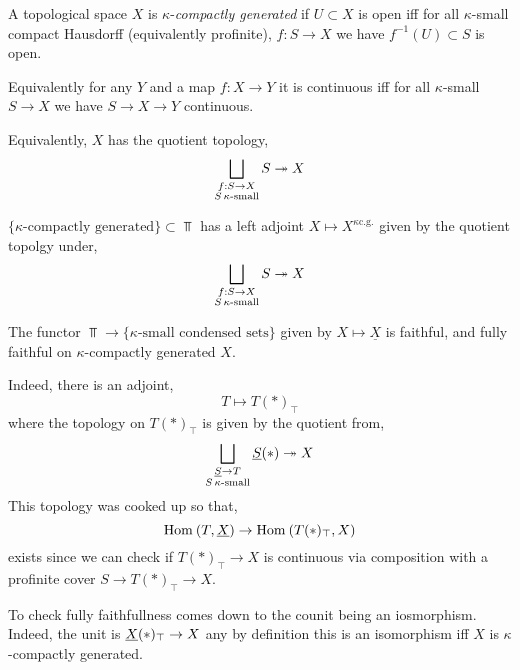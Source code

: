 \documentclass[12pt]{article}
\begin{document}
\begin{defn}
A topological space $X$ is $\kappa$-\textit{compactly generated} if $U \subset X$ is open iff for all $\kappa$-small compact Hausdorff (equivalently profinite), $f : S \to X$ we have $f^{-1}(U) \subset S$ is open. 
\end{defn}

\begin{rmk}
Equivalently for any $Y$ and a map $f : X \to Y$ it is continuous iff for all $\kappa$-small $S \to X$ we have $S \to X \to Y$ continuous. 
\end{rmk}

\begin{rmk}
Equivalently, $X$ has the quotient topology,
\[ \bigsqcup_{\substack{f : S \to X \\ S \, \kappa\text{-small}}} S \twoheadrightarrow X \]
\end{rmk}

\begin{prop}
$\{ \kappa\text{-compactly generated} \} \subset \Top$ has a left adjoint $X \mapsto X^{\kappa\text{c.g.}}$ given by the quotient topolgy under,
\[ \bigsqcup_{\substack{f : S \to X \\ S \, \kappa\text{-small}}} S \twoheadrightarrow X \]
\end{prop}

\begin{prop}
The functor $\Top \to \{ \kappa\text{-small condensed sets}\}$ given by $X \mapsto \underline{X}$ is faithful, and fully faithful on $\kappa$-compactly generated $X$.
\end{prop}

\begin{rmk}
Indeed, there is an adjoint,
\[ T \mapsto T(*)_{\top} \]
where the topology on $T(*)_{\top}$ is given by the quotient from,
\[ \bigsqcup_{\substack{\underline{S} \to T \\ S \, \kappa\text{-small}}} \underline{S}(*) \twoheadrightarrow X \]
This topology was cooked up so that,
\[ \mathrm{Hom}_{} \left( T, \underline{X} \right) \to \mathrm{Hom}_{} \left( T(*)_{\top}, X \right) \]
exists since we can check if $T(*)_\top \to X$ is continuous via composition with a profinite cover $S \to T(*)_{\top} \to X$.
\end{rmk}

\begin{rmk}
To check fully faithfullness comes down to the counit being an iosmorphism. Indeed, the unit is $\underline{X}(*)_\top \to X$ any by definition this is an isomorphism iff $X$ is $\kappa$-compactly generated. 
\end{rmk}
\end{document}
